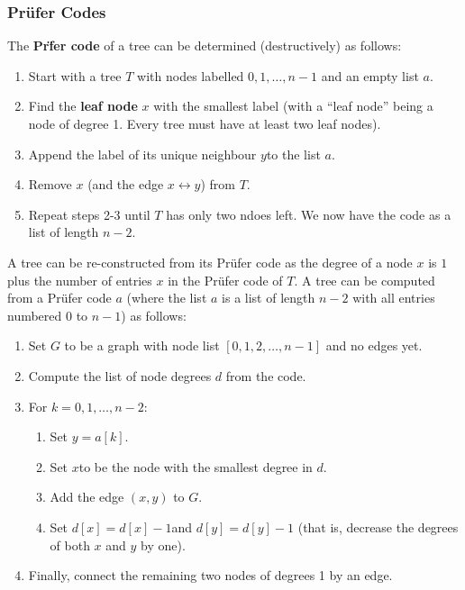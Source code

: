 \documentclass[a4paper,11pt]{article}
\begin{document}
\subsubsection{Pr\"ufer Codes}
The \textbf{Pr\"fer code} of a tree can be determined (destructively) as follows:
\begin{enumerate}
    \item   Start with a tree $T$ with nodes labelled $0, 1, \dots, n-1$ and an empty list $a$.
    \item   Find the \textbf{leaf node} $x$ with the smallest label (with a ``leaf node'' being a node of degree 1. Every tree must have at least two leaf nodes).
    \item   Append the label of its unique neighbour $y$to the list $a$.
    \item   Remove $x$ (and the edge $x \leftrightarrow y$) from $T$.
    \item   Repeat steps 2-3 until $T$ has only two ndoes left.
            We now have the code as a list of length $n-2$.
\end{enumerate}

A tree can be re-constructed from its Pr\"ufer code as the degree of a node $x$ is $1$ plus the number of entries $x$ in the Pr\"ufer code of $T$.
A tree can be computed from a Pr\"ufer code $a$ (where the list $a$ is a list of length $n-2$ with all entries numbered $0$ to $n-1$) as follows:
\begin{enumerate}
    \item   Set $G$ to be a graph with node list $[0,1,2, \dots, n-1]$ and no edges yet.
    \item   Compute the list of node degrees $d$ from the code.
    \item   For $k=0,1,\dots, n-2$: 
            \begin{enumerate}[label=\arabic*.]
                \item   Set $y = a[k]$.
                \item   Set $x$to be the node with the smallest degree in $d$.
                \item   Add the edge $(x,y)$ to $G$.
                \item   Set $d[x]=d[x]-1$and $d[y]=d[y]-1$ (that is, decrease the degrees of both $x$ and $y$ by one).
            \end{enumerate}
    \item   Finally, connect the remaining two nodes of degrees 1 by an edge.
\end{enumerate}
\end{document}

